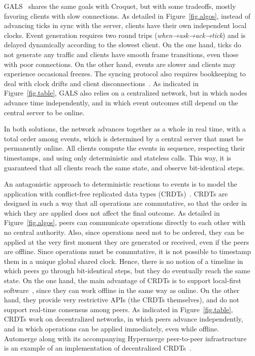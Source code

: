 \documentclass[10pt,journal,compsoc]{IEEEtran}
\begin{document}
GALS~\cite{gals} shares the same goals with Croquet, but with some tradeoffs,
mostly favoring clients with slow connections.
As detailed in Figure~\ref{fig.algos}, instead of advancing ticks in sync with
the server, clients have their own independent local clocks.
Event generation requires two round trips (\emph{when→ask→ack→tick}) and is
delayed dynamically according to the slowest client.
%
On the one hand, ticks do not generate any traffic and clients have smooth
frame transitions, even those with poor connections.
On the other hand, events are slower and clients may experience occasional
freezes.
The syncing protocol also requires bookkeeping to deal with clock drifts and
client disconnections~\cite{gals}.
%
As indicated in Figure~\ref{fig.table}, GALS also relies on a centralized
network, but in which nodes advance time independently, and in which event
outcomes still depend on the central server to be online.

In both solutions, the network advances together as a whole in real time, with
a total order among events, which is determined by a central server that must
be permanently online.
All clients compute the events in sequence, respecting their timestamps, and
using only deterministic and stateless calls.
This way, it is guaranteed that all clients reach the same state, and
observe bit-identical steps.

An antagonistic approach to deterministic reactions to events is to model the
application with conflict-free replicated data types (CRDTs)~\cite{crdts}.
CRDTs are designed in such a way that all operations are commutative, so that
the order in which they are applied does not affect the final outcome.
%
As detailed in Figure~\ref{fig.algos}, peers can communicate operations
directly to each other with no central authority.
Also, since operations need not to be ordered, they can be applied at the
very first moment they are generated or received, even if the peers are
offline.
%
Since operations must be commutative, it is not possible to timestamp them
in a unique global shared clock.
Hence, there is no notion of a timeline in which peers go through
bit-identical steps, but they do eventually reach the same state.
%
On the one hand, the main advantage of CRDTs is to support local-first
software~\cite{local}, since they can work offline in the same way as online.
On the other hand, they provide very restrictive APIs (the CRDTs themselves),
and do not support real-time consensus among peers.
%
As indicated in Figure~\ref{fig.table}, CRDTs work on decentralized networks,
in which peers advance independently, and in which operations can be applied
immediately, even while offline.
%
Automerge along with its accompanying Hypermerge peer-to-peer infrastructure
is an example of an implementation of decentralized
CRDTs~\cite{p2p.automerge,p2p.pushpin}.
\end{document}
